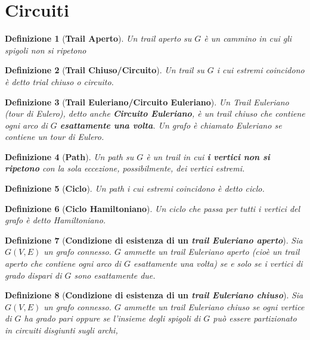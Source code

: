 \documentclass[10pt,a4paper,titlepage]{article}
\theoremstyle{break}
\newtheorem{myDef}{Definizione}
\theoremstyle{break}
\theoremstyle{break}
\begin{document}
\section{Circuiti}

\begin{myDef}[\textbf{Trail Aperto}]
Un \textit{trail aperto} su $G$ è un \textit{cammino} in cui gli spigoli non si ripetono
\end{myDef}

\begin{myDef}[\textbf{Trail Chiuso/Circuito}]
Un trail su $G$ i cui estremi coincidono è detto \textit{trial chiuso} o \textit{circuito}. 
\end{myDef}

\begin{myDef}[\textbf{Trail Euleriano/Circuito Euleriano}]
Un \textit{Trail Euleriano} (tour di Eulero), detto anche \textbf{Circuito Euleriano}, è un trail chiuso che contiene ogni arco di $G$ \textbf{esattamente una volta}. Un grafo è chiamato \textit{Euleriano} se contiene un tour di Eulero.
\end{myDef}

\begin{myDef}[\textbf{Path}]
Un \textit{path} su $G$ è un trail in cui \textbf{i vertici non si ripetono} con la sola eccezione, possibilmente, dei vertici estremi.
\end{myDef}

\begin{myDef}[\textbf{Ciclo}]
Un path i cui estremi coincidono è detto \textit{ciclo}.
\end{myDef}

\begin{myDef}[\textbf{Ciclo Hamiltoniano}]
Un ciclo che passa per tutti i vertici del grafo è detto \textit{Hamiltoniano}.
\end{myDef}

\begin{myDef}[\textbf{Condizione di esistenza di un \textit{trail Euleriano aperto}}]
Sia $G(V, E)$ un grafo connesso. $G$ ammette un trail Euleriano \textit{aperto} (cioè un trail aperto che contiene ogni arco di $G$ esattamente una volta) se e solo se i vertici di grado dispari di $G$ sono esattamente due.
\end{myDef}

\begin{myDef}[\textbf{Condizione di esistenza di un \textit{trail Euleriano chiuso}}]
Sia $G(V, E)$ un grafo connesso. $G$ ammette un trail Euleriano \textit{chiuso} se ogni vertice di $G$ ha grado \textit{pari} oppure se l'insieme degli spigoli di $G$ può essere partizionato in circuiti disgiunti sugli archi,

\end{myDef}
\end{document}

